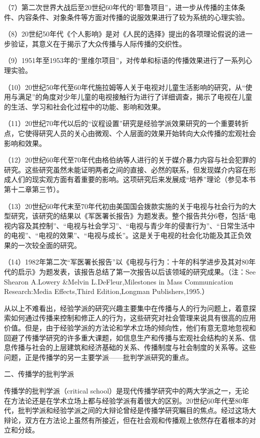 \documentclass[UTF8,12pt]{ctexart}
\numberwithin{equation}{section} %
\numberwithin{figure}{section}
\numberwithin{table}{section}
\begin{document}
	（7）第二次世界大战后至20世纪60年代的“耶鲁项目”，进一步从传播的主体条件、内容条件、对象条件等方面对传播的说服效果进行了较为系统的心理实验。
	
	（8）20世纪50年代《个人影响》是对《人民的选择》提出的各项理论假说的进一步验证，其意义在于揭示了大众传播与人际传播的交织性。
	
	（9）1951年至1953年的“里维尔项目”，对传单和标语的传播效果进行了一系列心理实验。
	
	（10）20世纪50年代至60年代施拉姆等人关于电视对儿童生活影响的研究，从“使用与满足”的角度对少年儿童的电视接触行为进行了详细调查，揭示了电视在儿童的生活、学习和社会化过程中的功能、影响和效果。
	
	（11）20世纪70年代以后的“议程设置”研究是经验学派效果研究的一个重要转折点，它使得研究人员的关心由微观、个人层面的效果开始转向大众传播的宏观社会影响和效果。
	
	（12）20世纪60年代至70年代由格伯纳等人进行的关于媒介暴力内容与社会犯罪的研究。这些研究虽然未能证明两者之间的直接、必然的联系，但发现媒介内容在形成人们的现实观方面有着重要的影响。这项研究后来发展成“培养”理论（参见本书第十二章第三节）。
	
	（13）20世纪60年代末至70年代初由美国国会拨款实施的关于电视与社会行为的大型研究，该研究的结果以《军医署长报告》为题发表。整个报告共分6卷，包括“电视内容及其控制”、“电视与社会学习”、“电视与青少年的侵害行为”、“日常生活中的电视”、“电视的效果”、“电视与成长”。这是关于电视的社会化功能及其正负效果的一次较全面的研究。
	
	（14）1982年第二次“军医署长报告”以《电视与行为：十年的科学进步及其对80年代的启示》为题发表，该报告总结了第一次报告以后该领域的研究成果。（注：See Shearon A.Lowery \&Melvin L.DeFleur,Milestones in Mass Communication Research:Media Effects,Third Edition,Longman Publishers,1995.）
	
	从以上不难看出，经验学派的研究兴趣主要集中在传播与人的行为问题上，着意探索如何通过传播来控制和修正人的行为，这些研究对社会管理来说具有很高的应用价值。但是，由于经验学派的方法论和学术立场的倾向性，他们有意无意地忽视和回避了传播学研究的许多重大课题，如信息生产和传播与宏观社会结构的关系、信息传播与社会的上层建筑和经济基础的关系、传播制度与社会制度的关系等。这些问题，正是传播学的另一主要学派——批判学派研究的重点。
	
	
	二、传播学的批判学派
	
	传播学的批判学派（critical school）是现代传播学研究中的两大学派之一，无论在方法论还是在学术立场上都与经验学派有着很大的区别。20世纪60年代至80年代，批判学派和经验学派之间的大辩论曾经是传播学研究瞩目的焦点。经过这场大辩论，双方在方法论上虽然有所接近，但在社会观和传播观上依然存在着根本的对立和分歧。
	
\end{document}
